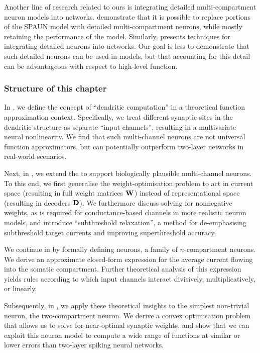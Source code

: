 Another line of research related to ours is integrating detailed multi-compartment neuron models into \NEF networks.
 demonstrate that it is possible to replace portions of the SPAUN model \citep{eliasmith2012largescale} with detailed multi-compartment neurons, while mostly retaining the performance of the model. Similarly, \citet{duggins2017incorporating} presents techniques for integrating detailed neurons into \NEF networks.
Our goal is less to demonstrate that such detailed neurons can be used in \NEF models, but that accounting for this detail can be advantageous with respect to high-level function.

\subsubsection{Structure of this chapter}
In , we define the concept of \enquote{dendritic computation} in a theoretical function approximation context.
Specifically, we treat different synaptic sites in the dendritic structure as separate \enquote{input channels}, resulting in a multivariate neural nonlinearity.
We find that such multi-channel neurons are not universal function approximators, but can potentially outperform two-layer networks in real-world scenarios.

Next, in , we extend the \NEF to support biologically plausible multi-channel neurons.
To this end, we first generalise the weight-optimisation problem to act in current space (resulting in full weight matrices $\mathbf{W}$) instead of representational space (resulting in decoders $\mathbf{D}$).
We furthermore discuss solving for nonnegative weights, as is required for conductance-based channels in more realistic neuron models, and introduce \enquote{subthreshold relaxation}, a method for de-emphasising subthreshold target currents and improving superthreshold accuracy.

We continue in  by formally defining \nlif neurons, a family of $n$-compartment \LIF neurons.
We derive an approximate closed-form expression for the average current flowing into the somatic compartment.
Further theoretical analysis of this expression yields rules according to which input channels interact divisively, multiplicatively, or linearly.

Subsequently, in , we apply these theoretical insights to the simplest non-trivial \nlif neuron, the two-compartment \LIF neuron.
We derive a convex optimisation problem that allows us to solve for near-optimal synaptic weights, and show that we can exploit this neuron model to compute a wide range of functions at similar or lower errors than two-layer spiking neural networks.

